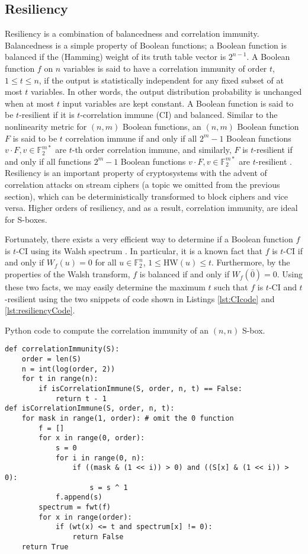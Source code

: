 \subsection{Resiliency}
Resiliency is a combination of balancedness and correlation immunity. Balancedness is a simple property of Boolean functions; a Boolean function is balanced if the (Hamming) weight of its truth table vector is $2^{n - 1}$. A Boolean function $f$ on $n$ variables is said to have a correlation immunity of order $t$, $1 \leq t \leq n$, if the output is statistically independent for any fixed subset of at most $t$ variables. In other words, the output distribution probability is unchanged when at most $t$ input variables are kept constant. A Boolean function is said to be $t$-resilient if it is $t$-correlation immune (CI) and balanced. Similar to the nonlinearity metric for $(n,m)$ Boolean functions, an $(n,m)$ Boolean function $F$ is said to be $t$ correlation immune if and only if all $2^m - 1$ Boolean functions $v \cdot F, v \in \mathbb{F}_2^{m*}$ are $t$-th order correlation immune, and similarly, $F$ is $t$-resilient if and only if all functions $2^m - 1$ Boolean functions $v \cdot F, v \in \mathbb{F}_2^{m*}$ are $t$-resilient \cite{Carlet04-1}. Resiliency is an important property of cryptosystems with the advent of correlation attacks on stream ciphers \cite{Canteaut05-1} (a topic we omitted from the previous section), which can be deterministically transformed to block ciphers and vice versa. Higher orders of resiliency, and as a result, correlation immunity, are ideal for S-boxes.

Fortunately, there exists a very efficient way to determine if a Boolean function $f$ is $t$-CI using its Walsh spectrum \cite{Gao11-1}. In particular, it is a known fact that $f$ is $t$-CI if and only if $W_f(u) = 0$ for all $u \in \mathbb{F}_2^n$, $1 \leq $HW$(u) \leq t$. Furthermore, by the properties of the Walsh transform, $f$ is balanced if and only if $W_f(\bar{0}) = 0$. Using these two facts, we may easily determine the maximum $t$ such that $f$ is $t$-CI and $t$-resilient using the two snippets of code shown in Listings \ref{lst:CIcode} and \ref{lst:resiliencyCode}. 

\begin{listing}[ht!]
\caption{Python code to compute the correlation immunity of an $(n, n)$ S-box.}
\begin{verbatim}
def correlationImmunity(S):
	order = len(S)
	n = int(log(order, 2))
	for t in range(n):
		if isCorrelationImmune(S, order, n, t) == False:
			return t - 1
def isCorrelationImmune(S, order, n, t):
	for mask in range(1, order): # omit the 0 function
		f = []
		for x in range(0, order):
			s = 0
			for i in range(0, n):
				if ((mask & (1 << i)) > 0) and ((S[x] & (1 << i)) > 0):
					s = s ^ 1
			f.append(s)
		spectrum = fwt(f)
		for x in range(order):
			if (wt(x) <= t and spectrum[x] != 0):
				return False
	return True
\end{verbatim}
\label{lst:CIcode}
\end{listing}

